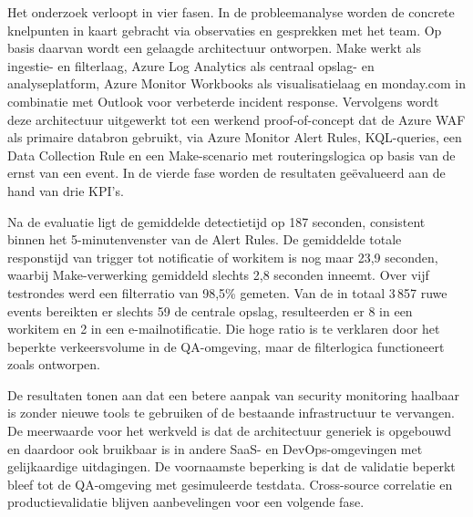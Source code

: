 Het onderzoek verloopt in vier fasen. In de probleemanalyse worden de concrete knelpunten in kaart gebracht via observaties en gesprekken met het team. Op basis daarvan wordt een gelaagde architectuur ontworpen. Make werkt als ingestie- en filterlaag, Azure Log Analytics als centraal opslag- en analyseplatform, Azure Monitor Workbooks als visualisatielaag en monday.com in combinatie met Outlook voor verbeterde incident response. Vervolgens wordt deze architectuur uitgewerkt tot een werkend proof-of-concept dat de Azure WAF als primaire databron gebruikt, via Azure Monitor Alert Rules, KQL-queries, een Data Collection Rule en een Make-scenario met routeringslogica op basis van de ernst van een event. In de vierde fase worden de resultaten geëvalueerd aan de hand van drie KPI's.

Na de evaluatie ligt de gemiddelde detectietijd op 187 seconden, consistent binnen het 5-minutenvenster van de Alert Rules. De gemiddelde totale responstijd van trigger tot notificatie of workitem is nog maar 23,9 seconden, waarbij Make-verwerking gemiddeld slechts 2,8 seconden inneemt. Over vijf testrondes werd een filterratio van 98,5\% gemeten. Van de in totaal 3\,857 ruwe events bereikten er slechts 59 de centrale opslag, resulteerden er 8 in een workitem en 2 in een e-mailnotificatie. Die hoge ratio is te verklaren door het beperkte verkeersvolume in de QA-omgeving, maar de filterlogica functioneert zoals ontworpen.

De resultaten tonen aan dat een betere aanpak van security monitoring haalbaar is zonder nieuwe tools te gebruiken of de bestaande infrastructuur te vervangen. De meerwaarde voor het werkveld is dat de architectuur generiek is opgebouwd en daardoor ook bruikbaar is in andere SaaS- en DevOps-omgevingen met gelijkaardige uitdagingen. De voornaamste beperking is dat de validatie beperkt bleef tot de QA-omgeving met gesimuleerde testdata. Cross-source correlatie en productievalidatie blijven aanbevelingen voor een volgende fase.
